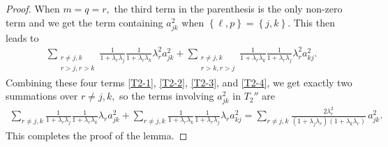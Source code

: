 \documentclass[10pt,a4paper]{amsart}
\newcommand{\set}[1]{\left\{#1\right\}}
\begin{document}
\begin{proof}
	When $m=q=r,$ the third term in the parenthesis is the only non-zero term and we get the term containing $a_{jk}^2$ when $\set{\ell,p}=\set{j,k}.$
	This then leads to
	\begin{align}\label{T2-4}
	\sum_{\substack{r\neq j,k\\r>j,r>k}}
	\frac 1{1+\lambda_r\lambda_j}
	\frac 1{1+\lambda_r\lambda_k}
	\lambda_r^2 a_{jk}^2
	+ \sum_{\substack{r\neq j,k\\r>k,r>j}}
	\frac 1{1+\lambda_r\lambda_k}
	\frac 1{1+\lambda_r\lambda_j}
	\lambda_r^2 a_{kj}^2.
	\end{align}
	Combining these four terms \eqref{T2-1}, \eqref{T2-2}, \eqref{T2-3}, and \eqref{T2-4}, we get exactly two summations over $r\neq j,k,$ so the terms involving $a_{jk}^2$ in $T_2''$ are 
	\begin{align*}
	\sum_{r\neq j,k}
	\frac 1{1+\lambda_r\lambda_j}
	\frac 1{1+\lambda_r\lambda_k}
	\lambda_r a_{jk}^2
	+ \sum_{r\neq j,k}
	\frac 1{1+\lambda_r\lambda_k}
	\frac 1{1+\lambda_r\lambda_j}
	\lambda_r a_{kj}^2
	= \sum_{r\neq j,k}
	\frac{2\lambda_r^2}
	{(1+\lambda_j\lambda_r)(1+\lambda_k\lambda_r)}
	\, a_{jk}^2.
	\end{align*}
	This completes the proof of the lemma.
\end{proof}
\end{document}
